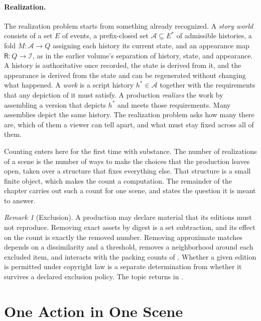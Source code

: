 \documentclass[11pt,twoside,openright]{book}
\theoremstyle{plain}
\theoremstyle{definition}
\theoremstyle{remark}
\newtheorem{remark}[theorem]{Remark}
\newcommand{\Img}{\mathcal{I}}      %
\newcommand{\Ren}{\mathsf{R}}       %
\newcommand{\Adm}{\mathcal{A}}      %
\begin{document}
\paragraph{Realization.} The realization problem starts from something already recognized. A \emph{story world} consists of a set $E$ of events, a prefix-closed set $\Adm\subseteq E^*$ of admissible histories, a fold $M:\Adm\to Q$ assigning each history its current state, and an appearance map $\Ren:Q\to\Img$, as in the earlier volume's separation of history, state, and appearance. A history is authoritative once recorded, the state is derived from it, and the appearance is derived from the state and can be regenerated without changing what happened. A \emph{work} is a script history $h^\ast\in\Adm$ together with the requirements that any depiction of it must satisfy. A production \emph{realizes} the work by assembling a version that depicts $h^\ast$ and meets those requirements. Many assemblies depict the same history. The realization problem asks how many there are, which of them a viewer can tell apart, and what must stay fixed across all of them.

Counting enters here for the first time with substance. The number of realizations of a scene is the number of ways to make the choices that the production leaves open, taken over a structure that fixes everything else. That structure is a small finite object, which makes the count a computation. The remainder of the chapter carries out such a count for one scene, and  states the question it is meant to answer.

\begin{remark}[Exclusion]\label{rem:exclusion}
A production may declare material that its editions must not reproduce. Removing exact assets by digest is a set subtraction, and its effect on the count is exactly the removed number. Removing approximate matches depends on a dissimilarity and a threshold, removes a neighborhood around each excluded item, and interacts with the packing counts of . Whether a given edition is permitted under copyright law is a separate determination from whether it survives a declared exclusion policy. The topic returns in .
\end{remark}

\section{One Action in One Scene}\label{sec:lawn}
\end{document}
